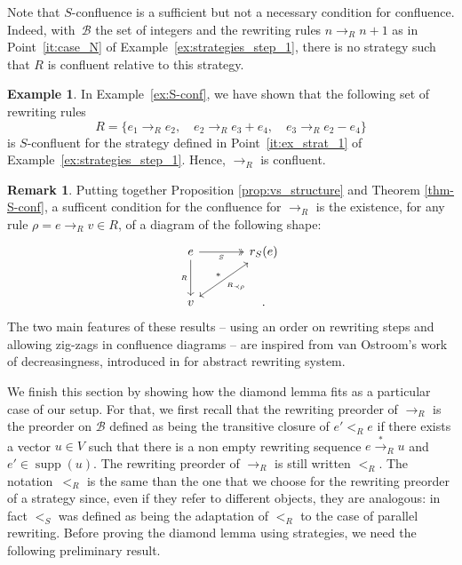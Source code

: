 \documentclass[11pt]{article}
\theoremstyle{definition}
\newtheorem{remark}[theorem]{Remark}
\newtheorem{example}[theorem]{Example}
\newcommand\basis{\mathscr{B}}
\newcommand\ordS{<_S}
\newcommand\ordR{<_R}
\DeclareMathOperator{\supp}{supp}
\newcommand\rewR{\to_R}
\newcommand\transR{\overset{*}{\to}_R}
\begin{document}
Note that $S$-confluence is a sufficient but not a necessary condition for
confluence. Indeed, with~$\basis$ the set of integers and the rewriting rules
$n\rewR n+1$ as in Point~\ref{it:case_N} of
Example~\ref{ex:strategies_step_1}, there is no strategy such that $R$ is
confluent relative to this strategy.
\smallskip

\begin{example}\label{ex:conf}
  In Example~\ref{ex:S-conf}, we have shown that the following set of
  rewriting rules
  \[R=\{e_1\rewR e_2,\quad e_2\rewR e_3+e_4,\quad e_3\rewR e_2-e_4\}\]
  is $S$-confluent for the strategy defined in Point~\ref{it:ex_strat_1}
  of Example~\ref{ex:strategies_step_1}. Hence, $\rewR$ is confluent.
\end{example}
\smallskip


\begin{remark}
  
  Putting together Proposition \ref{prop:vs_structure} and Theorem \ref{thm-S-conf}, a sufficent condition for the confluence for $\rewR$ is the existence, for any rule $\rho = e \rewR v \in R$,
   of a diagram of the following shape:
   \[\begin{tikzcd}[sep = large]
    e\ar[d, "_R"']\ar[r, twoheadrightarrow, "_S"'] &
    r_S(e)  \\
    v \ar[ru, "_{R_{\prec \rho}}"', leftrightarrow, "*"] &.
  \end{tikzcd}\]
The two main features of these results -- using an order on rewriting steps and allowing  zig-zags in confluence diagrams -- are inspired from van Ostroom's work of decreasingness, introduced in \cite{van2008confluence} for abstract rewriting system.
  
\end{remark}

\smallskip

We finish this section by showing how the diamond lemma fits as a
particular case of our setup. For that, we first recall that the
rewriting preorder of $\rewR$ is the preorder on $\basis$ defined as
being the transitive closure of $e'\ordR e$ if there exists a vector
$u\in V$ such that there is a non empty rewriting sequence $e\transR u$
and $e'\in\supp(u)$. The rewriting preorder of $\rewR$ is still written
$\ordR$. The notation~$\ordR$ is the same than the one that we choose for
the rewriting preorder of a strategy since, even if they refer to
different objects, they are analogous: in fact $\ordS$ was defined as
being the adaptation of $\ordR$ to the case of parallel rewriting. Before
proving the diamond lemma using strategies, we need the following
preliminary result.
\smallskip
\end{document}
